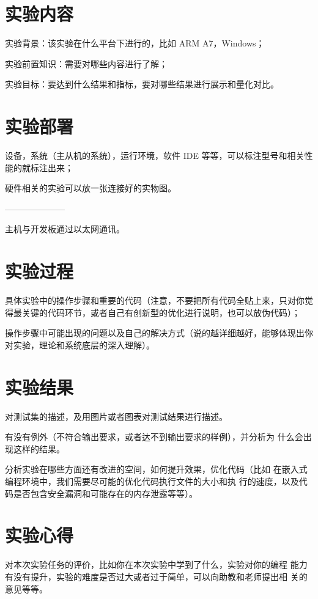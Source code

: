 \section{实验内容}

实验背景：该实验在什么平台下进行的，比如 ARM A7，Windows；

实验前置知识：需要对哪些内容进行了解；

实验目标：要达到什么结果和指标，要对哪些结果进行展示和量化对比。

\section{实验部署}

设备，系统（主从机的系统），运行环境，软件 IDE 等等，可以标注型号和相关性能的就标注出来；

硬件相关的实验可以放一张连接好的实物图。


---------------------

主机与开发板通过以太网通讯。


\section{实验过程}

具体实验中的操作步骤和重要的代码（注意，不要把所有代码全贴上来，只对你觉得最关键的代码环节，或者自己有创新型的优化进行说明，也可以放伪代码）；

操作步骤中可能出现的问题以及自己的解决方式（说的越详细越好，能够体现出你对实验，理论和系统底层的深入理解）。


\section{实验结果}

对测试集的描述，及用图片或者图表对测试结果进行描述。

有没有例外（不符合输出要求，或者达不到输出要求的样例），并分析为
什么会出现这样的结果。

分析实验在哪些方面还有改进的空间，如何提升效果，优化代码（比如
在嵌入式编程环境中，我们需要尽可能的优化代码执行文件的大小和执
行的速度，以及代码是否包含安全漏洞和可能存在的内存泄露等等）。

\section{实验心得}

对本次实验任务的评价，比如你在本次实验中学到了什么，实验对你的编程
能力有没有提升，实验的难度是否过大或者过于简单，可以向助教和老师提出相
关的意见等等。

